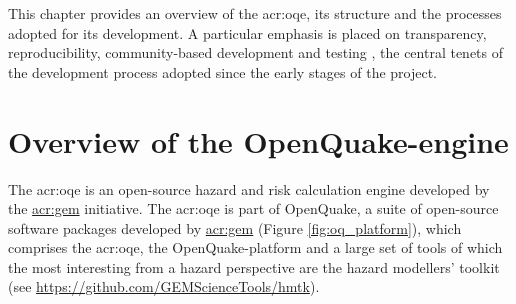 This chapter provides an overview of the \gls{acr:oqe}, 
its structure and the processes adopted for its development. 
A particular emphasis is placed on transparency, reproducibility,
community-based development and testing \parencite{pagani2014}, 
the central tenets of the development process adopted since the early stages of the project. 
%
\section{Overview of the OpenQuake-engine}
%
The \gls{acr:oqe} is an open-source hazard and risk calculation engine 
developed by the 
\href{http://globalquakemodel.org}{\gls{acr:gem}} initiative.
%
The \gls{acr:oqe} is part of OpenQuake, a suite of open-source software packages
developed by \href{http://globalquakemodel.org}{\gls{acr:gem}} (Figure
\ref{fig:oq_platform}), which comprises the \gls{acr:oqe}, the
OpenQuake-platform and a large set of tools of which the most interesting from a
hazard perspective are the hazard modellers' toolkit (see
\href{https://github.com/GEMScienceTools/hmtk}
{https://github.com/GEMScienceTools/hmtk}).


